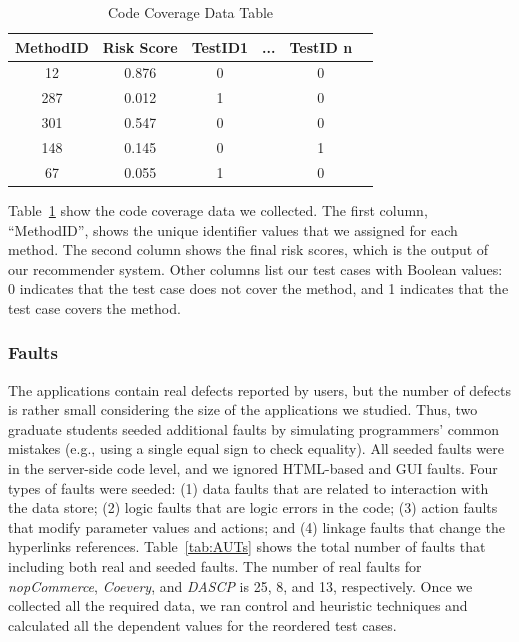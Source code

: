  
\begin{table}[!ht]
\caption{Code Coverage Data Table}
\vspace*{-10pt}
\begin{center}
\begin{tabular}{|c|c|c|c|c|c|} \hline
	MethodID  & Risk Score & TestID1 & ... & TestID n \\\hline
	12 & 0.876 & 0 &  & 0 \\\hline
	287 & 0.012 & 1 &  & 0 \\\hline
	301 & 0.547 & 0 &  & 0 \\\hline
	148 & 0.145 & 0 &  & 1 \\\hline
	67 & 0.055 & 1 &  & 0 \\\hline			
\end{tabular}
\end {center}
\label{tab:coverage}
\vspace*{-10pt}
\end{table}

	
Table~\ref{tab:coverage} show the code coverage data we collected.
The first column, ``MethodID'', shows
the unique identifier values that we assigned for each method. 
The second column shows the final risk scores, which is the output of 
our recommender system. Other columns list our test cases
with Boolean values: 0 indicates that the test case does not cover 
the method, and 1 indicates that the test case covers the method.

\subsubsection{Faults}
\label{faultsInfo}

The applications contain real defects reported by users, but the number of 
defects is rather small considering the size of the applications we studied.
Thus, two graduate students seeded additional faults by simulating  programmers' 
common mistakes (e.g., using a single equal sign to check equality).
All seeded faults were in the server-side code level, and we ignored HTML-based and GUI faults. 
Four types of faults were seeded: (1) data faults that are related to interaction with 
the data store; (2) logic faults that are logic errors in the code; (3) action faults that modify 
parameter values and actions; and (4) linkage faults that change the hyperlinks references.  
Table~\ref{tab:AUTs} shows the total number of faults that including both real and 
seeded faults. The number of real faults for {\em nopCommerce}, {\em Coevery}, and 
{\em DASCP} is 25, 8, and 13, respectively. Once we collected all the required data, 
we ran control and heuristic 
techniques and calculated all the dependent values for the reordered test cases.

